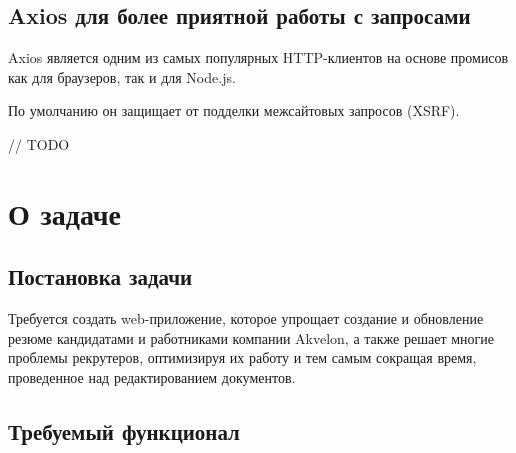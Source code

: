 \documentclass[a4paper,12pt]{diplom}
\begin{document}
\section{Axios для более приятной работы с запросами}

Axios является одним из самых популярных HTTP-клиентов на основе промисов как для браузеров, так и для Node.js.

По умолчанию он защищает от подделки межсайтовых запросов (XSRF).

// TODO


\chapter{О задаче}

\section{Постановка задачи}

Требуется создать web-приложение, которое упрощает создание и обновление резюме кандидатами и работниками компании Akvelon,
а также решает многие проблемы рекрутеров, оптимизируя их работу и тем самым сокращая время,
проведенное над редактированием документов.

\section{Требуемый функционал}
\end{document}
